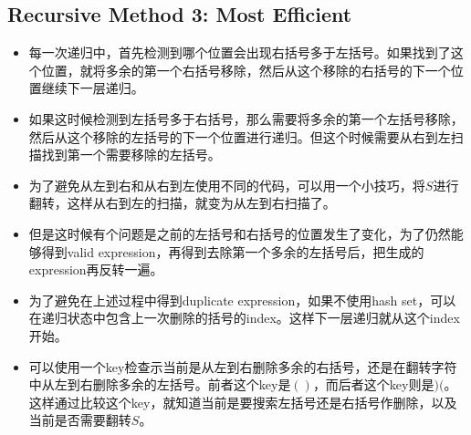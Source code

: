 \subsection{Recursive Method 3: Most Efficient}
\begin{itemize}
\item 每一次递归中，首先检测到哪个位置会出现右括号多于左括号。如果找到了这个位置，就将多余的第一个右括号移除，然后从这个移除的右括号的下一个位置继续下一层递归。
\item 如果这时候检测到左括号多于右括号，那么需要将多余的第一个左括号移除，然后从这个移除的左括号的下一个位置进行递归。但这个时候需要从右到左扫描找到第一个需要移除的左括号。
\item 为了避免从左到右和从右到左使用不同的代码，可以用一个小技巧，将$S$进行翻转，这样从右到左的扫描，就变为从左到右扫描了。
\item 但是这时候有个问题是之前的左括号和右括号的位置发生了变化，为了仍然能够得到valid expression，再得到去除第一个多余的左括号后，把生成的expression再反转一遍。
\item 为了避免在上述过程中得到duplicate expression，如果不使用hash set，可以在递归状态中包含上一次删除的括号的index。这样下一层递归就从这个index开始。
\item 可以使用一个key检查示当前是从左到右删除多余的右括号，还是在翻转字符中从左到右删除多余的左括号。前者这个key是$()$，而后者这个key则是$)($。这样通过比较这个key，就知道当前是要搜索左括号还是右括号作删除，以及当前是否需要翻转$S$。
\end{itemize}
